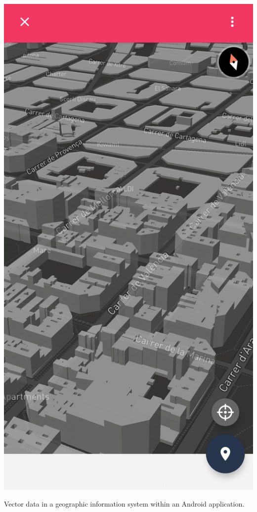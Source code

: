 \begin{marginfigure}[-11cm]
	\includegraphics{figs/fundamentals/raster_gis.png}
	\caption{Vector data in a geographic information system within an Android application.}
	\label{fig:raster_gis}
\end{marginfigure}

